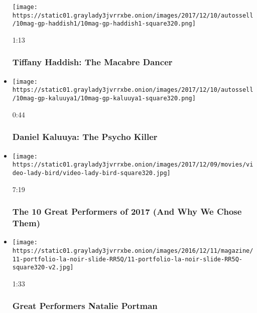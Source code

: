 \begin{itemize}
  \texttt{[image: https://static01.graylady3jvrrxbe.onion/images/2017/12/10/autossell/10mag-gp-haddish1/10mag-gp-haddish1-square320.png]}

  1:13

  \hypertarget{tiffany-haddish-the-macabre-dancer}{%
  \subsubsection{Tiffany Haddish: The Macabre
  Dancer}\label{tiffany-haddish-the-macabre-dancer}}
\item
  \href{https://www.nytimes3xbfgragh.onion/video/magazine/100000005588890/daniel-kaluuya-the-psycho-killer.html?action=click\&module=video-series-bar\&region=header\&pgtype=Article\&playlistId=video/great-performers}{}

  \texttt{[image: https://static01.graylady3jvrrxbe.onion/images/2017/12/10/autossell/10mag-gp-kaluuya1/10mag-gp-kaluuya1-square320.png]}

  0:44

  \hypertarget{daniel-kaluuya-the-psycho-killer}{%
  \subsubsection{Daniel Kaluuya: The Psycho
  Killer}\label{daniel-kaluuya-the-psycho-killer}}
\item
  \href{https://www.nytimes3xbfgragh.onion/video/magazine/100000005555132/the-10-great-performers-of-2017-and-why-we-chose-them.html?action=click\&module=video-series-bar\&region=header\&pgtype=Article\&playlistId=video/great-performers}{}

  \texttt{[image: https://static01.graylady3jvrrxbe.onion/images/2017/12/09/movies/video-lady-bird/video-lady-bird-square320.jpg]}

  7:19

  \hypertarget{the-10-great-performers-of-2017-and-why-we-chose-them}{%
  \subsubsection{The 10 Great Performers of 2017 (And Why We Chose
  Them)}\label{the-10-great-performers-of-2017-and-why-we-chose-them}}
\item
  \href{https://www.nytimes3xbfgragh.onion/video/magazine/100000004793909/great-performers-natalie-portman.html?action=click\&module=video-series-bar\&region=header\&pgtype=Article\&playlistId=video/great-performers}{}

  \texttt{[image: https://static01.graylady3jvrrxbe.onion/images/2016/12/11/magazine/11-portfolio-la-noir-slide-RR5Q/11-portfolio-la-noir-slide-RR5Q-square320-v2.jpg]}

  1:33

  \hypertarget{great-performers--natalie-portman}{%
  \subsubsection{Great Performers \textbar{} Natalie
  Portman}\label{great-performers--natalie-portman}}
\end{itemize}

